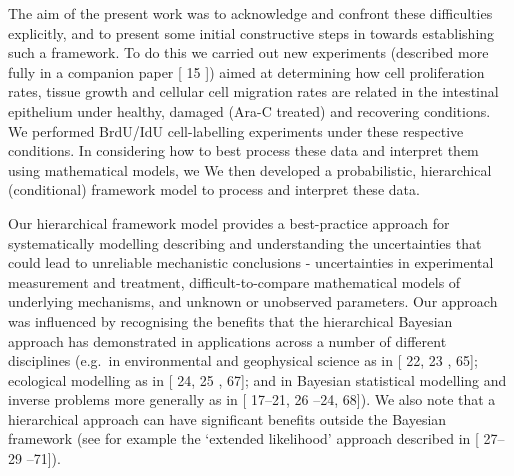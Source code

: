 \documentclass[10pt,letterpaper]{article}
\providecommand{\DIFaddtex}[1]{{\protect\color{blue} \sf #1}} %
\providecommand{\DIFdeltex}[1]{{\protect\color{red} \scriptsize #1}} %
\providecommand{\DIFaddbegin}{} %
\providecommand{\DIFaddend}{} %
\providecommand{\DIFdelbegin}{} %
\providecommand{\DIFdelend}{} %
\providecommand{\DIFadd}[1]{\texorpdfstring{\DIFaddtex{#1}}{#1}} %
\providecommand{\DIFdel}[1]{\texorpdfstring{\DIFdeltex{#1}}{}} %
\begin{document}
The aim of the present work was to acknowledge and confront these
difficulties explicitly, and to present some initial constructive steps
\DIFdelbegin \DIFdel{in }\DIFdelend \DIFaddbegin \DIFadd{towards }\DIFaddend establishing such a framework. To do this we carried out new
experiments (described more fully in a companion paper {[}\DIFdelbegin \DIFdel{15}\DIFdelend \DIFaddbegin \DIFadd{18}\DIFaddend {]}) aimed
at determining how \DIFaddbegin \DIFadd{cell }\DIFaddend proliferation rates, tissue growth and \DIFdelbegin \DIFdel{cellular
}\DIFdelend \DIFaddbegin \DIFadd{cell
}\DIFaddend migration rates are related in the intestinal epithelium under healthy,
damaged (Ara-C treated) and recovering conditions. We performed BrdU/IdU
cell-labelling experiments under these respective conditions. \DIFdelbegin \DIFdel{In
considering how to best process these data and interpret them using
mathematical models, we }\DIFdelend \DIFaddbegin \DIFadd{We }\DIFaddend then
developed a probabilistic, hierarchical (conditional) \DIFdelbegin \DIFdel{framework}\DIFdelend \DIFaddbegin \DIFadd{model to process
and interpret these data}\DIFaddend .

Our hierarchical \DIFdelbegin \DIFdel{framework }\DIFdelend \DIFaddbegin \DIFadd{model }\DIFaddend provides a best-practice approach for \DIFdelbegin \DIFdel{systematically modelling }\DIFdelend \DIFaddbegin \DIFadd{describing
}\DIFaddend and understanding the uncertainties that could lead to unreliable
mechanistic conclusions - uncertainties in experimental measurement and
treatment, difficult-to-compare mathematical models of underlying
mechanisms, and unknown or unobserved parameters. Our approach was
influenced by recognising the benefits that the hierarchical Bayesian
approach has demonstrated in applications across a number of different
disciplines (e.g.~in environmental and geophysical science as in {[}\DIFdelbegin \DIFdel{22,
23}\DIFdelend \DIFaddbegin \DIFadd{64,
65}\DIFaddend {]}; ecological modelling as in {[}\DIFdelbegin \DIFdel{24, 25}\DIFdelend \DIFaddbegin \DIFadd{66, 67}\DIFaddend {]}; and in Bayesian
statistical modelling and inverse problems more generally as in
{[}\DIFdelbegin \DIFdel{17--21, 26}\DIFdelend \DIFaddbegin \DIFadd{20--24, 68}\DIFaddend {]}). We also note that a hierarchical approach can have
significant benefits outside the Bayesian framework (see for example the
`extended likelihood' approach described in {[}\DIFdelbegin \DIFdel{27--29}\DIFdelend \DIFaddbegin \DIFadd{69--71}\DIFaddend {]}).
\end{document}
